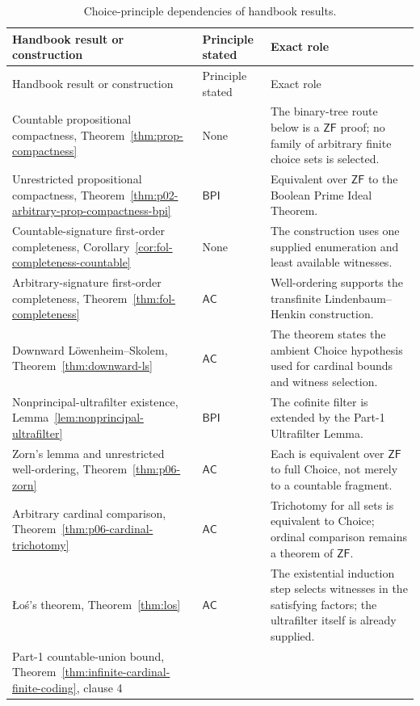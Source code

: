 \begingroup\small
\begin{longtable}{@{}p{}p{}p{}@{}}
\caption{Choice-principle dependencies of handbook results.}
\label{tab:p06-choice-dependencies}\\
\toprule
Handbook result or construction & Principle stated & Exact role \\
\midrule
\endfirsthead
\toprule
Handbook result or construction & Principle stated & Exact role \\
\midrule
\endhead
Countable propositional compactness,
Theorem~\ref{thm:prop-compactness} & None & The binary-tree route below is a
\(\mathsf{ZF}\) proof; no family of arbitrary finite choice sets is selected. \\
Unrestricted propositional compactness,
Theorem~\ref{thm:p02-arbitrary-prop-compactness-bpi} & \(\mathsf{BPI}\) &
Equivalent over \(\mathsf{ZF}\) to the Boolean Prime Ideal Theorem. \\
Countable-signature first-order completeness,
Corollary~\ref{cor:fol-completeness-countable} & None & The construction
uses one supplied enumeration and least available witnesses. \\
Arbitrary-signature first-order completeness,
Theorem~\ref{thm:fol-completeness} & \(\mathsf{AC}\) & Well-ordering
supports the transfinite Lindenbaum--Henkin construction. \\
Downward L\"owenheim--Skolem,
Theorem~\ref{thm:downward-ls} & \(\mathsf{AC}\) & The theorem states the
ambient Choice hypothesis used for cardinal bounds and witness selection. \\
Nonprincipal-ultrafilter existence,
Lemma~\ref{lem:nonprincipal-ultrafilter} & \(\mathsf{BPI}\) & The
cofinite filter is extended by the Part-1 Ultrafilter Lemma. \\
Zorn's lemma and unrestricted well-ordering,
Theorem~\ref{thm:p06-zorn} & \(\mathsf{AC}\) & Each is equivalent over
\(\mathsf{ZF}\) to full Choice, not merely to a countable fragment. \\
Arbitrary cardinal comparison,
Theorem~\ref{thm:p06-cardinal-trichotomy} & \(\mathsf{AC}\) & Trichotomy for
all sets is equivalent to Choice; ordinal comparison remains a theorem of
\(\mathsf{ZF}\). \\
\L o\'s's theorem, Theorem~\ref{thm:los} & \(\mathsf{AC}\) & The
existential induction step selects witnesses in the satisfying factors; the
ultrafilter itself is already supplied. \\
Part-1 countable-union bound,
Theorem~\ref{thm:infinite-cardinal-finite-coding}, clause 4 &

\end{longtable}
